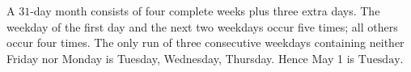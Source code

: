 A $31$-day month consists of four complete weeks plus three extra days. The weekday of the first day and the next two weekdays occur five times; all others occur four times. The only run of three consecutive weekdays containing neither Friday nor Monday is Tuesday, Wednesday, Thursday. Hence May 1 is $\boxed{\text{Tuesday}}$.

